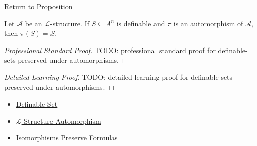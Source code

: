 \newpage
{}
\label{prf:definable-sets-preserved-under-automorphisms}

\begin{remark*}[Return]
\hyperref[prop:definable-sets-preserved-under-automorphisms]{Return to Proposition}
\end{remark*}

\begin{proposition*}
Let $\mathcal{A}$ be an $\mathcal{L}$-structure. If
$S\subseteq A^n$ is definable and $\pi$ is an automorphism of $\mathcal{A}$,
then $\pi(S)=S$.
\end{proposition*}

\begin{proof}[Professional Standard Proof]
\LRAProofBodyStart
TODO: professional standard proof for definable-sets-preserved-under-automorphisms.
\end{proof}

\begin{proof}[Detailed Learning Proof]
\LRAProofBodyStart
TODO: detailed learning proof for definable-sets-preserved-under-automorphisms.
\end{proof}

\begin{remark*}
\end{remark*}

\begin{dependencies}
\begin{itemize}
  \item \hyperref[def:definable-set]{Definable Set}
  \item \hyperref[def:l-structure-automorphism]{$\mathcal{L}$-Structure Automorphism}
  \item \hyperref[prop:isomorphisms-preserve-formulas]{Isomorphisms Preserve Formulas}
\end{itemize}
\end{dependencies}

\clearpage
